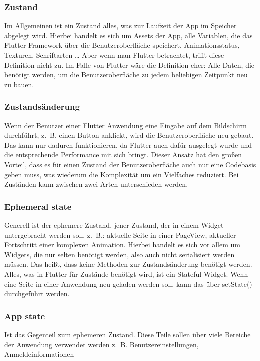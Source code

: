\subsubsection{Zustand}
Im Allgemeinen ist ein Zustand alles, was zur Laufzeit der App im Speicher abgelegt wird. Hierbei handelt es sich um  Assets der App, alle Variablen, die das Flutter-Framework über die Benutzeroberfläche speichert, Animationsstatus, Texturen, Schriftarten … Aber wenn man Flutter betrachtet, trifft diese Definition nicht zu. Im Falle von Flutter wäre die Definition eher: Alle Daten, die benötigt werden, um die Benutzeroberfläche zu jedem beliebigen Zeitpunkt neu zu bauen.

\subsubsection{Zustandsänderung}
Wenn der Benutzer einer Flutter Anwendung eine Eingabe auf dem Bildschirm durchführt, z. B. einen Button anklickt, wird die Benutzeroberfläche neu gebaut. Das kann nur dadurch funktionieren, da Flutter auch dafür ausgelegt wurde und die entsprechende Performance mit sich bringt. Dieser Ansatz hat den großen Vorteil, dass es für einen Zustand der Benutzeroberfläche auch nur eine Codebasis geben muss, was wiederum die Komplexität um ein Vielfaches reduziert. Bei Zuständen kann zwischen zwei Arten unterschieden werden.

\subsubsection{Ephemeral state}
Generell ist der ephemere Zustand, jener Zustand, der in einem Widget untergebracht werden soll, z. B.: aktuelle Seite in einer PageView, aktueller Fortschritt einer komplexen Animation. Hierbei handelt es sich vor allem um Widgets, die nur selten benötigt werden, also auch nicht serialisiert werden müssen. Das heißt, dass keine Methoden zur Zustandsänderung benötigt werden. Alles, was in Flutter für Zustände benötigt wird, ist ein Stateful Widget. Wenn eine Seite in einer Anwendung neu geladen werden soll, kann das über setState() durchgeführt werden.

\subsubsection{App state}
Ist das Gegenteil zum ephemeren Zustand. Diese Teile sollen über viele Bereiche der Anwendung verwendet werden z. B. Benutzereinstellungen, Anmeldeinformationen

